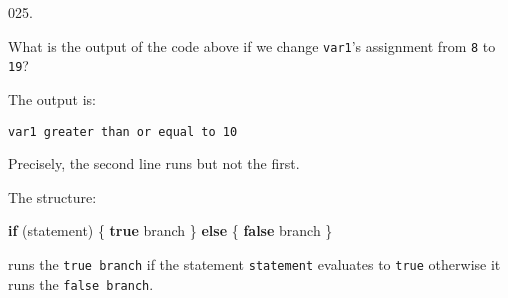 \documentclass[]{book}
\newenvironment{Shaded}{}{}
\newcommand{\ControlFlowTok}[1]{\textcolor[rgb]{0.00,0.44,0.13}{\textbf{#1}}}
\newcommand{\KeywordTok}[1]{\textcolor[rgb]{0.00,0.44,0.13}{\textbf{#1}}}
\newcommand{\NormalTok}[1]{#1}
\begin{document}
\vspace{2mm}\noindent\hrulefill{}

\begin{minipage}{\linewidth}\noindent
{\tiny 025.}\\
\begin{minipage}[t]{.485\linewidth}

What is the output of the code above if we change \texttt{var1}'s
assignment from \texttt{8} to \texttt{19}?

\end{minipage}
\hfill
\begin{minipage}[t]{.485\linewidth}

The output is:

\begin{framed}

\begin{verbatim}
var1 greater than or equal to 10
\end{verbatim}

\end{framed}

Precisely, the second line runs but not the first.

The structure:

\begin{framed}

\begin{Shaded}
\begin{Highlighting}[]
\ControlFlowTok{if}\NormalTok{ (statement) \{}
  \KeywordTok{true}\NormalTok{ branch}
\NormalTok{\} }\ControlFlowTok{else}\NormalTok{ \{}
  \KeywordTok{false}\NormalTok{ branch}
\NormalTok{\}}
\end{Highlighting}
\end{Shaded}

\end{framed}

runs the \texttt{true\ branch} if the statement \texttt{statement}
evaluates to \texttt{true} otherwise it runs the \texttt{false\ branch}.

\end{minipage}
\end{minipage}

\vspace{2mm}\noindent\hrulefill{}
\end{document}
